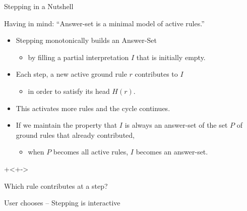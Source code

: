 \documentclass[trans,draft]{beamer} %
\begin{document}
\begin{frame}{Stepping in a Nutshell}
	\onslide<+->
	
	Having in mind: ``Answer-set is a minimal model of active rules.''
	
	\onslide<+->
	\begin{itemize}
		\item Stepping monotonically builds an Answer-Set
		\onslide<+->
		\begin{itemize}
			\item by filling a partial interpretation $I$ that is initially empty.
		\end{itemize}
		\onslide<+->
		\item Each step, a new active ground rule $r$ contributes to $I$
		\onslide<+->
		\begin{itemize}
			\item in order to satisfy its head $H(r)$.
		\end{itemize}
		\onslide<+->
		\item This activates more rules and the cycle continues.
		\onslide<+->
		\item If we maintain the property that $I$ is always an answer-set of
		the set $P$ of ground rules that already contributed,
		\onslide<+->
		\begin{itemize}
			\item when $P$ becomes all active rules, $I$ becomes an answer-set.
		\end{itemize}
	\end{itemize}
	
	\onslide+<+->{\vspace{10pt}

		Which rule contributes at a step?

		\onslide<+->
		User chooses -- Stepping is interactive
	}
	
\end{frame}
\end{document}
